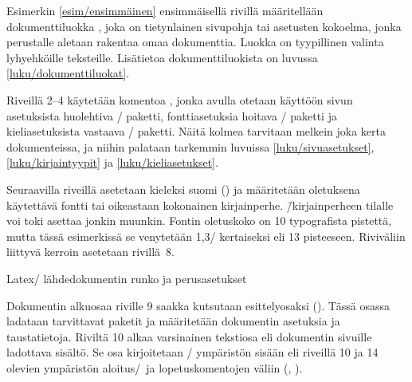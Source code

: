Esimerkin \ref{esim/ensimmäinen} ensimmäisellä rivillä määritellään
dokumenttiluokka , joka on tietynlainen sivupohja tai
asetusten kokoelma, jonka perustalle aletaan rakentaa omaa dokumenttia.
Luokka  on tyypillinen valinta lyhyehköille teksteille.
Lisätietoa dokumenttiluokista on luvussa \ref{luku/dokumenttiluokat}.

Riveillä 2--4 käytetään komentoa , jonka avulla
otetaan käyttöön sivun asetuksista huolehtiva \-/
paketti, fonttiasetuksia hoitava \-/ paketti ja
kieliasetuksista vastaava \-/ paketti. Näitä kolmea
tarvitaan melkein joka kerta dokumenteissa, ja niihin palataan tarkemmin
luvuissa \ref{luku/sivuasetukset}, \ref{luku/kirjaintyypit} ja
\ref{luku/kieliasetukset}.

Seuraavilla riveillä asetetaan kieleksi suomi () ja
määritetään oletuksena käytettävä fontti tai oikeastaan kokonainen
kirjainperhe.  \=/kirjainperheen tilalle voi
toki asettaa jonkin muunkin. Fontin oletuskoko on 10 typografista
pistettä, mutta tässä esimerkissä se venytetään 1,3\-/ kertaiseksi eli
13 pisteeseen. Riviväliin liittyvä kerroin asetetaan rivillä~8.

\begin{esimerkki*}

  \caption{Latex\-/ lähdedokumentin runko ja perusasetukset}
  \label{esim/ensimmäinen}
\end{esimerkki*}

Dokumentin alkuosaa riville 9 saakka kutsutaan esittelyosaksi
(). Tässä osassa ladataan tarvittavat paketit ja
määritetään dokumentin asetuksia ja taustatietoja. Riviltä 10 alkaa
varsinainen tekstiosa eli dokumentin sivuille ladottava sisältö. Se osa
kirjoitetaan \-/ ympäristön sisään eli riveillä 10
ja 14 olevien ympäristön aloitus\-/\ ja lopetuskomentojen väliin
(, ).

